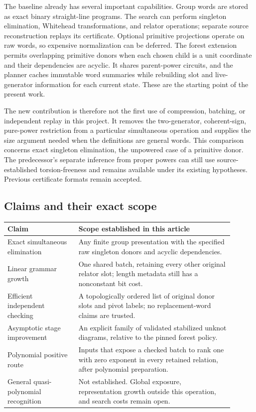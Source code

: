The baseline already has several important capabilities. Group words are
stored as exact binary straight-line programs. The search can perform
singleton elimination, Whitehead transformations, and relator operations;
separate source reconstruction replays its certificate. Optional primitive
projections operate on raw words, so expensive normalization can be deferred.
The forest extension permits overlapping primitive donors when each chosen
child is a unit coordinate and their dependencies are acyclic. It shares
parent-power circuits, and the planner caches immutable word summaries while
rebuilding slot and live-generator information for each current state.
These are the starting point of the present work.

The new contribution is therefore not the first use of compression, batching,
or independent replay in this project. It removes the two-generator,
coherent-sign, pure-power restriction from a particular simultaneous
operation and supplies the size argument needed when the definitions are
general words. This comparison concerns exact singleton elimination, the
unpowered case of a primitive donor. The predecessor's separate inference
from proper powers can still use source-established torsion-freeness and
remains available under its existing hypotheses. Previous certificate
formats remain accepted.

\subsection{Claims and their exact scope}

\begin{center}
\small
\begin{tabular}{p{0.29\linewidth}p{0.61\linewidth}}
\toprule
Claim & Scope established in this article \\
\midrule
Exact simultaneous elimination & Any finite group presentation with the
specified raw singleton donors and acyclic dependencies. \\
Linear grammar growth & One shared batch, retaining every other original
relator slot; length metadata still has a nonconstant bit cost. \\
Efficient independent checking & A topologically ordered list of original
donor slots and pivot labels; no replacement-word claims are trusted. \\
Asymptotic stage improvement & An explicit family of validated stabilized
unknot diagrams, relative to the pinned forest policy. \\
Polynomial positive route & Inputs that expose a checked batch to rank one
with zero exponent in every retained relation, after polynomial preparation. \\
General quasi-polynomial recognition & Not established. Global exposure,
representation growth outside this operation, and search costs remain open. \\
\bottomrule
\end{tabular}
\end{center}

